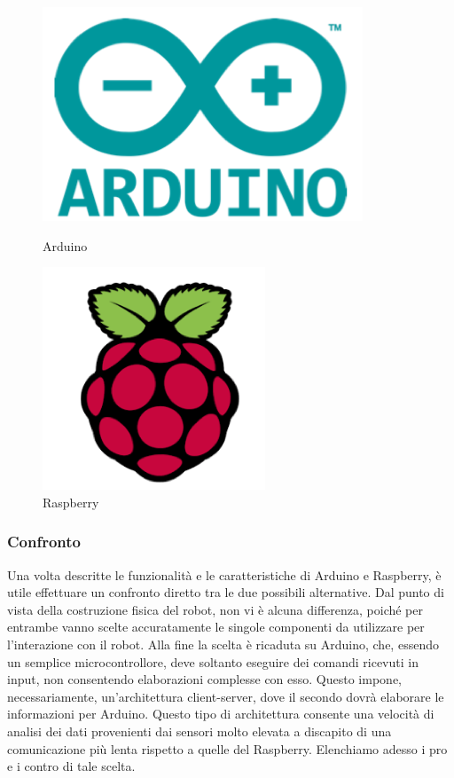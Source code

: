 \documentclass[a4paper,12pt,italian]{article}
\begin{document}
\begin{figure}[H]
\centering
\begin{minipage}{.5\textwidth}
  \centering
  \includegraphics[scale=0.5]{arduino_symbol}
  \caption{Arduino}
  \label{fig:arduino_symbol}
\end{minipage}%
\begin{minipage}{.5\textwidth}
  \centering
  \includegraphics[scale=0.5]{raspberry}
  \caption{Raspberry}
  \label{fig:raspberry}
\end{minipage}
\end{figure}

\subsubsection{Confronto}
Una volta descritte le funzionalità e le caratteristiche di Arduino e Raspberry, è utile effettuare un confronto diretto tra le due possibili alternative. Dal punto di vista della costruzione fisica del robot, non vi è alcuna differenza, poiché per entrambe vanno scelte accuratamente le singole componenti da utilizzare per l'interazione con il robot. Alla fine la scelta è ricaduta su Arduino, che, essendo un semplice microcontrollore, deve soltanto eseguire dei comandi ricevuti in input, non consentendo elaborazioni complesse con esso. Questo impone, necessariamente, un’architettura client-server, dove il secondo dovrà elaborare le informazioni per Arduino. Questo tipo di architettura consente una velocità di analisi dei dati provenienti dai sensori molto elevata a discapito di una comunicazione più lenta rispetto a quelle del Raspberry. Elenchiamo adesso i pro e i contro di tale scelta.	
       
\end{document}
